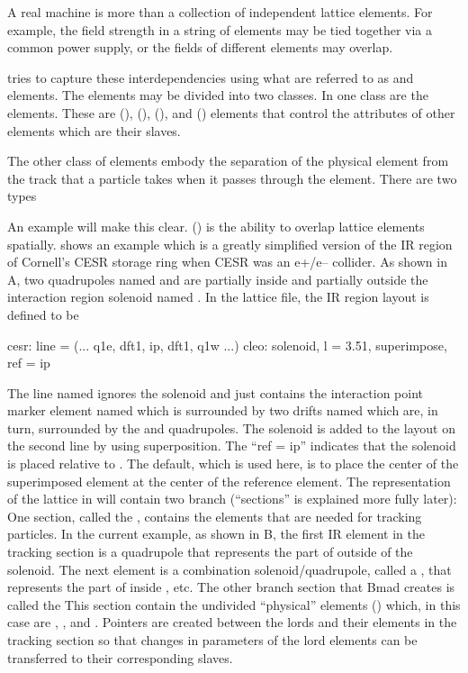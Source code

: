 
A real machine is more than a collection of independent lattice elements. For example, the field
strength in a string of elements may be tied together via a common power supply, or the fields of
different elements may overlap.

\bmad tries to capture these interdependencies using what are referred to as  and
 elements. The  elements may be divided into two classes. In one class are the
 elements.  These are  (),  (),
 (), and  () elements that control the
attributes of other elements which are their slaves.

The other class of  elements embody the separation of the physical element from the track
that a particle takes when it passes through the element. There are two types

An example will make this clear.   () is the ability to overlap
lattice elements spatially.  shows an example which is a greatly simplified version
of the IR region of Cornell's CESR storage ring when CESR was an e+/e-- collider. As shown in
A, two quadrupoles named  and  are partially inside and partially
outside the interaction region solenoid named . In the lattice file, the IR region layout
is defined to be
 {\small
\begin{example}
  cesr: line = (... q1e, dft1, ip, dft1, q1w ...)
  cleo: solenoid, l = 3.51, superimpose, ref = ip
\end{example}
 }
The line named  ignores the solenoid and just contains the interaction point marker element
named  which is surrounded by two drifts named  which are, in turn, surrounded by
the  and  quadrupoles. The solenoid is added to the layout on the second line by
using superposition. The ``ref = ip'' indicates that the solenoid is placed relative to . The
default, which is used here, is to place the center of the superimposed  element at the
center of the  reference element.  The representation of the lattice in \bmad will contain
two branch  (``sections'' is explained more fully later): One section, called the
, contains the elements that are needed for tracking particles. In the current
example, as shown in B, the first IR element in the tracking section is a quadrupole
that represents the part of  outside of the solenoid. The next element is a combination
solenoid/quadrupole, called a , that represents the part of  inside ,
etc.  The other branch section that Bmad creates is called the  This section
contain the undivided ``physical''  elements () which, in this case are
, , and . Pointers are created between the lords and their 
elements in the tracking section so that changes in parameters of the lord elements can be
transferred to their corresponding slaves.

